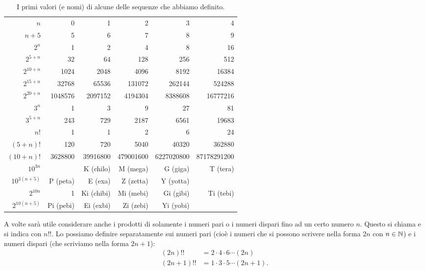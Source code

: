 \begin{table}
  \begin{center}
  \begin{tabular}{r|>{\small}r>{\small}r>{\small}r>{\small}r>{\small}r}
  $n$       & 0 & 1 & 2 & 3 & 4 \\
  \footnotesize $n+5$     & 5 & 6 & 7 & 8 & 9 \\ \hline
  $2^n$     & 1 & 2 & 4 & 8 & 16 \\
  \footnotesize $2^{5+n}$ & 32 & 64 & 128 & 256 & 512 \\
  \footnotesize $2^{10+n}$ & 1024 & 2048 & 4096 & 8192 & 16384 \\
  \footnotesize $2^{15+n}$ & 32768 & 65536 & 131072 & 262144 & 524288 \\
  \footnotesize $2^{20+n}$ & 1048576 & 2097152 & 4194304 & 8388608 & 16777216 \\  \hline
  $3^n$                    & 1 & 3 & 9 & 27 & 81 \\
  \footnotesize $3^{5+n}$  & 243 & 729 & 2187 & 6561 & 19683 \\  \hline
  $n!$      & 1 & 1 & 2 & 6 & 24 \\
  \footnotesize $(5+n)!$  & 120 & 720 & 5040 & 40320 & 362880 \\
  \footnotesize $(10+n)!$  & 3628800 & 39916800 & 479001600 & 6227020800 & 87178291200 \\ \hline
  \footnotesize $10^{3n}$  &  & K (chilo) & M (mega) & G (giga) & T (tera) \\ 
  \footnotesize $10^{3(n+5)}$  & P (peta) & E (exa) & Z (zetta) & Y (yotta) \\ \hline
  \footnotesize $2^{10n}$  & 1 & Ki (chibi) & Mi (mebi) & Gi (gibi) & Ti (tebi) \\
  \footnotesize $2^{10(n+5)}$ & Pi (pebi)& Ei (exbi) & Zi (zebi) & Yi (yobi)
  \end{tabular}
  \end{center}
  \caption{I primi valori (e nomi) di alcune delle sequenze che abbiamo definito.}
  \end{table}
  
  A volte sarà utile considerare anche i prodotti di solamente i numeri
  pari o i numeri dispari fino ad un certo numero $n$. Questo
  si chiama  e si indica con $n!!$. 
  Lo possiamo definire separatamente sui numeri pari (cioè 
  i numeri che si possono scrivere nella forma $2n$ con $n\in \mathbb N$)
  e i numeri dispari (che scriviamo nella forma $2n+1$):
  \begin{align*}
    (2n)!! &= 2 \cdot 4 \cdot 6 \cdots (2n) \\
    (2n+1)!! &= 1 \cdot 3 \cdot 5 \cdots (2n+1).
  \end{align*}
  
